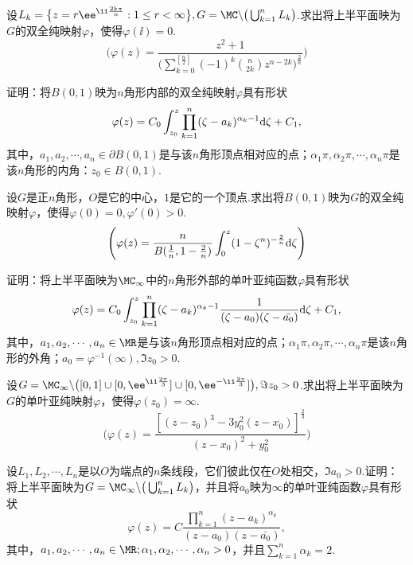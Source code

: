 \begin{xiti}
\item 设$L_k=\big\{z=r\ee^{\ii\frac{2k\pi}n}:1\le r<\infty\big\},G=\MC\backslash
\big(\bigcup_{k=1}^nL_k\big)$.求出将上半平面映为$G$的双全纯映射$\varphi$，使得$\varphi(\ii)=0$.
\[\Bigg(\varphi(z)=\frac{z^2+1}{\bigg(\sum_{k=0}^{[\frac n2]}
(-1)^k\binom n{2k}z^{n-2k}\bigg)^{\frac2n}}\Bigg)\]
\item 证明：将$B(0,1)$映为$n$角形内部的双全纯映射$\varphi$具有形状
\[\varphi(z)=C_0\int_{z_0}^z\prod_{k=1}^n(\zeta-a_k)^{\alpha_k-1}\textrm d\zeta+C_1,\]
其中，$a_1,a_2,\cdots,a_n\in\partial B(0,1)$是与该$n$角形顶点相对应的点；$\alpha_1\pi,\alpha_2\pi,\cdots,\alpha_n\pi$是该$n$角形的内角：$z_0\in B(0,1)$.
\item 设$G$是正$n$角形，$O$是它的中心，$1$是它的一个顶点.求出将$B(0,1)$映为$G$的双全纯映射$\varphi$，使得$\varphi(0)=0,\varphi'(0)>0$.
\[\Bigg(\varphi(z)=\frac n{B(\frac1n,1-\frac2n)}\int_0^z(1-\zeta^n)^{-\frac2n}\textrm d\zeta\Bigg)\]
\item 证明：将上半平面映为$\MC_\infty$中的$n$角形外部的单叶亚纯函数$\varphi$具有形状
\[\varphi(z)=C_0\int_{z_0}^z\prod_{k=1}^n(\zeta-a_k)^{\alpha_k-1}
\frac1{(\zeta-a_0)(\zeta-\bar{a_0})}\textrm d\zeta+C_1,\]
其中，$a_1,a_2,\cdots,a_n\in\MR$是与该$n$角形顶点相对应的点；$\alpha_1\pi,\alpha_2\pi,\cdots,\alpha_n\pi$是该$n$角形的外角；$a_0=\varphi^{-1}(\infty),\Im z_0>0$.
\item 设$G=\MC_\infty\backslash\big([0,1]\cup[0,\ee^{\ii\frac{2\pi}3}]\cup
[0,\ee^{-\ii\frac{2\pi}3}]\big),\Im z_0>0$.求出将上半平面映为$G$的单叶亚纯映射$\varphi$，使得$\varphi(z_0)=\infty$.
\[\bigg(\varphi(z)=\frac{[(z-z_0)^3-3y_0^2(z-x_0)]^{\frac23}}{(z-x_0)^2+y_0^2}\bigg)\]
\item 设$L_1,L_2,\cdots,L_n$是以$O$为端点的$n$条线段，它们彼此仅在$O$处相交，$\Im a_0>0$.证明：将上半平面映为$G=\MC_\infty\backslash\big(\bigcup_{k=1}^n
    L_k\big)$，并且将$a_0$映为$\infty$的单叶亚纯函数$\varphi$具有形状
\[\varphi(z)=C\frac{\prod_{k=1}^n(z-a_k)^{\alpha_k}}{(z-a_0)(z-\bar{a_0})},\]
其中，$a_1,a_2,\cdots,a_n\in\MR;\alpha_1,\alpha_2,\cdots,\alpha_n>0$，并且$\sum_{k=1}^n\alpha_k=2$.

\end{xiti}
